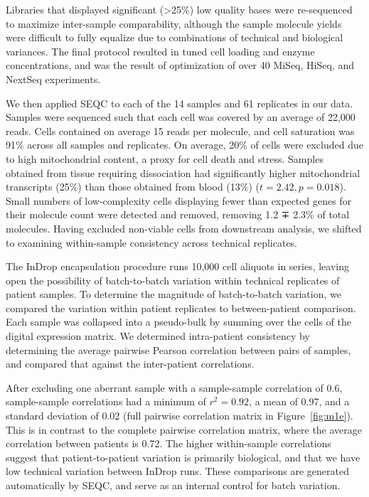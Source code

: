 Libraries that displayed significant (\textgreater{}25\%) low quality bases were re-sequenced to maximize inter-sample comparability, although the sample molecule yields were difficult to fully equalize due to combinations of technical and biological variances. 
The final protocol resulted in tuned cell loading and enzyme concentrations, and was the result of optimization of over 40 MiSeq, HiSeq, and NextSeq experiments.

We then applied SEQC to each of the 14 samples and 61 replicates in our data. 
Samples were sequenced such that each cell was covered by an average of 22,000 reads. %
Cells contained on average 15 reads per molecule, and cell saturation was 91\% across all samples and replicates. 
On average, 20\% of cells were excluded due to high mitochondrial content, a proxy for cell death and stress. 
Samples obtained from tissue requiring dissociation had significantly higher mitochondrial transcripts (25\%) than those obtained from blood (13\%) ($t=2.42, p=0.018$). 
Small numbers of low-complexity cells displaying fewer than expected genes for their molecule count were detected and removed, removing 1.2 ∓ 2.3\% of total molecules. 
Having excluded non-viable cells from downstream analysis, we shifted to examining within-sample consistency across technical replicates.

The InDrop encapsulation procedure runs 10,000 cell aliquots in series, leaving open the possibility of batch-to-batch variation within technical replicates of patient samples. 
To determine the magnitude of batch-to-batch variation, we compared the variation within patient replicates to between-patient comparison. 
Each sample was collapsed into a pseudo-bulk by summing over the cells of the digital expression matrix. 
We determined intra-patient consistency by determining the average pairwise Pearson correlation between pairs of samples, and compared that against the inter-patient correlations. 

After excluding one aberrant sample with a sample-sample correlation of 0.6, sample-sample correlations had a minimum of $r^{2}=0.92$, a mean of 0.97, and a standard deviation of 0.02 (full pairwise correlation matrix in Figure~\ref{fig:m1e}). %
This is in contrast to the complete pairwise correlation matrix, where the average correlation between patients is 0.72. 
The higher within-sample correlations suggest that patient-to-patient variation is primarily biological, and that we have low technical variation between InDrop runs. 
These comparisons are generated automatically by SEQC, and serve as an internal control for batch variation.

